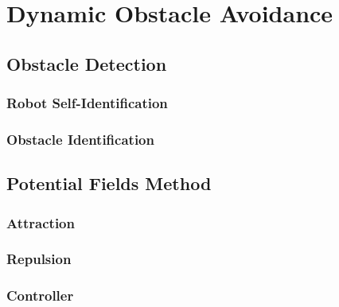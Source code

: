 \chapter{Dynamic Obstacle Avoidance}
\label{chapter:obstacle}

\section{Obstacle Detection}
\label{section:obstacle-detection}

\subsection{Robot Self-Identification}

\subsection{Obstacle Identification}

\section{Potential Fields Method}
\label{section:pf-method}

\subsection{Attraction}

\subsection{Repulsion}

\subsection{Controller}